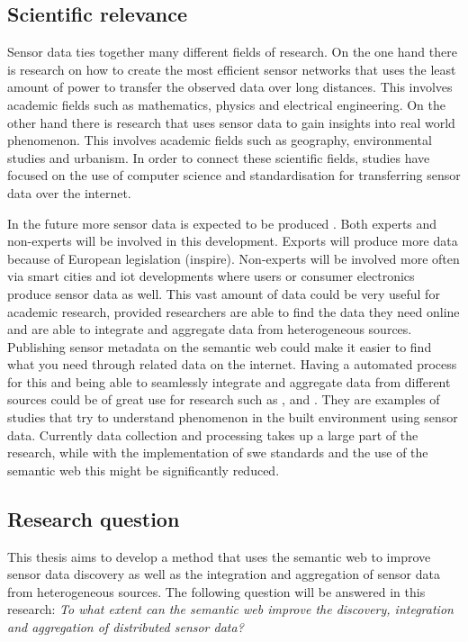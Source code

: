 \subsection{Scientific relevance}
Sensor data ties together many different fields of research. On the one hand there is research on how to create the most efficient sensor networks that uses the least amount of power to transfer the observed data over long distances. This involves academic fields such as mathematics, physics and electrical engineering. On the other hand there is research that uses sensor data to gain insights into real world phenomenon. This involves academic fields such as geography, environmental studies and urbanism. In order to connect these scientific fields, studies have focused on the use of computer science and standardisation for transferring sensor data over the internet. 

In the future more sensor data is expected to be produced \citep{IoT:PWC}. Both experts and non-experts will be involved in this development. Exports will produce more data because of European legislation (\ac{inspire}). Non-experts will be involved more often via smart cities and \ac{iot} developments where users or consumer electronics produce sensor data as well. This vast amount of data could be very useful for academic research, provided researchers are able to find the data they need online and are able to integrate and aggregate data from heterogeneous sources. Publishing sensor metadata on the semantic web could make it easier to find what you need through related data on the internet. Having a automated process for this and being able to seamlessly integrate and aggregate data from different sources could be of great use for research such as \cite{UC:vanderHoeven}, \cite{UC:Hotterdam} and \cite{UC:Theunisse}. They are examples of studies that try to understand phenomenon in the built environment using sensor data. Currently data collection and processing takes up a large part of the research, while with the implementation of \ac{swe} standards and the use of the semantic web this might be significantly reduced.  

\subsection{Research question}
This thesis aims to develop a method that uses the semantic web to improve sensor data discovery as well as the integration and aggregation of sensor data from heterogeneous sources. The following question will be answered in this research:   
\textit{To what extent can the semantic web improve the discovery, integration and aggregation of distributed sensor data?} 
